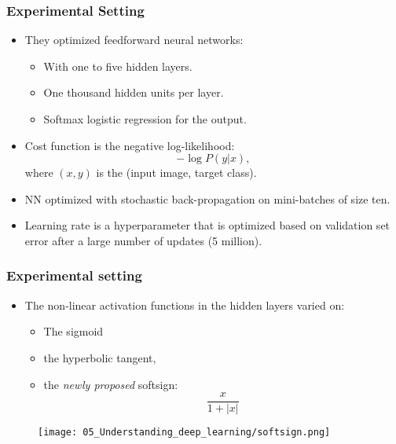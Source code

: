 \begin{frame}
  \frametitle{Experimental Setting}
  \begin{itemize}
    \item They optimized feedforward neural networks: 
    \begin{itemize}
      \item With one to five hidden layers. 
      \item One thousand hidden units per layer. 
      \item Softmax logistic regression for the output. 
    \end{itemize}
    \item Cost function is the negative log-likelihood: 
    \begin{equation}
      - \log P(y|x),
    \end{equation}
    where $(x,y)$ is the (input image, target class). 
    \item NN optimized with stochastic back-propagation on mini-batches of size ten. 
    \item Learning rate is a hyperparameter that is optimized based on validation set error after a large number of updates (5 million). 
  \end{itemize}
\end{frame}

\begin{frame}
  \frametitle{Experimental setting}

  \begin{itemize}
    \item The non-linear activation functions in the hidden layers varied on: 
    \begin{itemize}
      \item The sigmoid
      \item the hyperbolic tangent,
      \item the \textit{newly proposed} softsign: 
      \begin{equation}
        \frac{x}{1 + |x|}
      \end{equation}
    \end{itemize}
  \end{itemize}

  \begin{figure}[t]
    \texttt{[image: 05\_Understanding\_deep\_learning/softsign.png]}
    \centering
\end{figure}

\end{frame}

